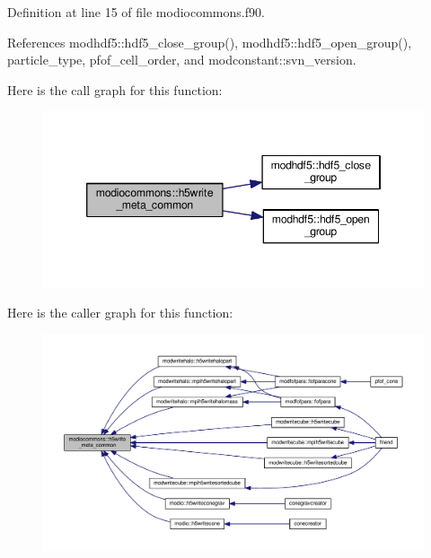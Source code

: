 Definition at line 15 of file modiocommons.\+f90.



References modhdf5\+::hdf5\+\_\+close\+\_\+group(), modhdf5\+::hdf5\+\_\+open\+\_\+group(), particle\+\_\+type, pfof\+\_\+cell\+\_\+order, and modconstant\+::svn\+\_\+version.



Here is the call graph for this function\+:\nopagebreak
\begin{figure}[H]
\begin{center}
\leavevmode
\includegraphics[width=346pt]{namespacemodiocommons_a34d5806274712591a9d885c1d926af57_cgraph}
\end{center}
\end{figure}




Here is the caller graph for this function\+:\nopagebreak
\begin{figure}[H]
\begin{center}
\leavevmode
\includegraphics[width=350pt]{namespacemodiocommons_a34d5806274712591a9d885c1d926af57_icgraph}
\end{center}
\end{figure}


